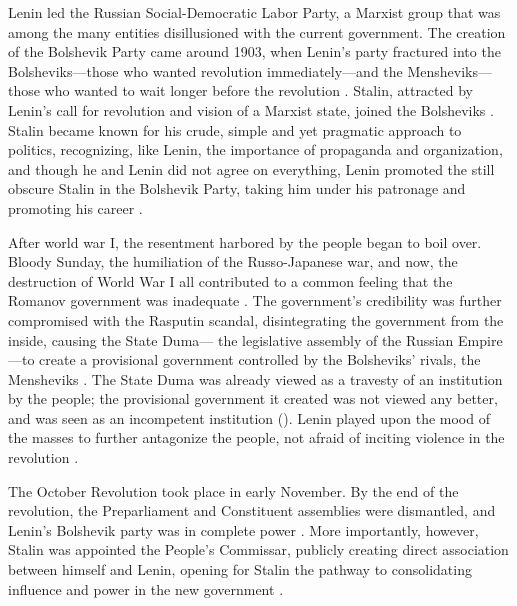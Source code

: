 \documentclass[a4paper,12pt]{article}
\begin{document}
        Lenin led the Russian Social-Democratic Labor Party, a Marxist group that was among the many
        entities disillusioned with the current government. The creation of the Bolshevik Party came
        around 1903, when Lenin's party fractured into the Bolsheviks---those who wanted revolution
        immediately---and the Mensheviks---those who wanted to wait longer before the revolution
        \cite[37]{pitirims}. Stalin, attracted by Lenin's call for revolution and vision of a
        Marxist state, joined the Bolsheviks \cite[54]{servicer}. Stalin became known for his crude,
        simple and yet pragmatic approach to politics, recognizing, like Lenin, the importance of
        propaganda and organization, and though he and Lenin did not agree on everything, Lenin
        promoted the still obscure Stalin in the Bolshevik Party, taking him under his patronage and
        promoting his career \cite[77,124]{servicer}.

        After world war I, the resentment harbored by the people began to boil over. Bloody Sunday,
        the humiliation of the Russo-Japanese war, and now, the destruction of World War I all
        contributed to a common feeling that the Romanov government was inadequate
        \cite[18,26,32]{pitirims}. The government's credibility was further compromised with the
        Rasputin scandal, disintegrating the government from the inside, causing the State Duma---
        the legislative assembly of the Russian Empire---to create a provisional government
        controlled by the Bolsheviks' rivals, the Mensheviks \cite[44]{pitirims}. The State Duma was
        already viewed as a travesty of an institution by the people; the provisional government it
        created was not viewed any better, and was seen as an incompetent institution
        (\cites[338]{danielsr}[32]{kuromiyah}). Lenin played upon the mood of the masses to further
        antagonize the people, not afraid of inciting violence in the revolution
        \cite[335]{danielsr}.

        The October Revolution took place in early November. By the end of the revolution, the
        Preparliament and Constituent assemblies were dismantled, and Lenin's Bolshevik party was in
        complete power \cite[46-47]{basilj}. More importantly, however, Stalin was appointed the
        People's Commissar, publicly creating direct association between himself and Lenin, opening
        for Stalin the pathway to consolidating influence and power in the new government
        \cite[124]{servicer}.
\end{document}
